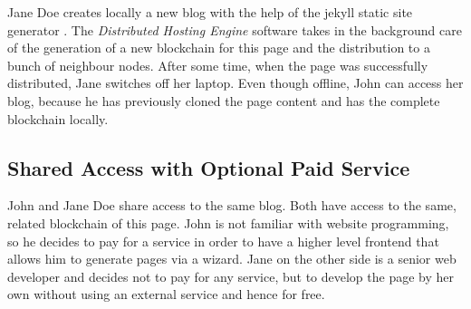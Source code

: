 Jane Doe creates locally a new blog with the help of the jekyll static site
generator \cite{Preston-Werner2015}. The \textit{Distributed Hosting Engine}
software takes in the background care of the generation of a new blockchain
for this page and the distribution to a bunch of neighbour nodes. After some
time, when the page was successfully distributed, Jane switches off her
laptop. Even though offline, John can access her blog, because he has
previously cloned the page content and has the complete blockchain locally.

\subsection{Shared Access with Optional Paid Service}

John and Jane Doe share access to the same blog. Both have access to the same,
related blockchain of this page. John is not familiar with website
programming, so he decides to pay for a service in order to have a higher
level frontend that allows him to generate pages via a wizard. Jane on the
other side is a senior web developer and decides not to pay for any service,
but to develop the page by her own without using an external service and hence
for free.

